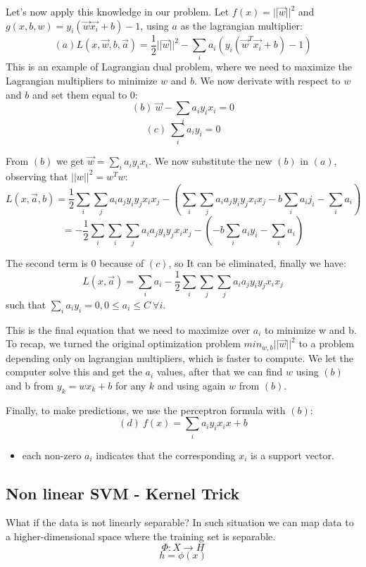 \documentclass{article}
\begin{document}
Let's now apply this knowledge in our problem. Let
\(f(x)=||\vec{w}||^2\) and \(g(x, b, w)=y_i(\vec{w}\vec{x_i}+b)-1\),
using \(a\) as the lagrangian multiplier:
\[(a) L(x, \vec{w}, b, \vec{a}) = \frac{1}{2}||\vec{w}||^2 - \sum_i a_i (y_i(\vec{w}^T\vec{x_i} + b) - 1)\]
This is an example of Lagrangian dual problem, where we need to maximize
the Lagrangian multipliers to minimize \(w\) and \(b\). We now derivate
with respect to \(w\) and \(b\) and set them equal to \(0\):
\[(b)\ \vec{w} - \sum_i a_i y_i x_i = 0\] \[(c)\ \sum_i a_i y_i = 0\]

From \((b)\) we get \(\vec{w} = \sum_i a_i y_i x_i\). We now substitute
the new \((b)\) in \((a)\), observing that \(||w||^2 = w^Tw\):
\[L(x, \vec{a}, b) = \frac{1}{2}\sum_i \sum_j a_i a_j y_i y_j x_i x_j - (\sum_i \sum_j a_i a_j y_i y_j x_i x_j - b\sum_i a_i j_i - \sum_i a_i) \]
\[ = -\frac{1}{2}\sum_i \sum_i \sum_j a_i a_j y_i y_j x_i x_j - (-b\sum_i a_i y_i - \sum_i a_i) \]

The second term is \(0\) because of \((c)\), so It can be eliminated,
finally we have:
\[ L(x, \vec{a}) = \sum_i a_i -\frac{1}{2}\sum_i \sum_j \sum_j a_i a_j y_i y_j x_i x_j \]
such that \(\sum_i a_i y_i = 0, 0 \le a_i \le C\ \forall i\).

This is the final equation that we need to maximize over \(a_i\) to
minimize w and b. To recap, we turned the original optimization problem
\(min_{w, b} ||\vec{w}||^2\) to a problem depending only on lagrangian
multipliers, which is faster to compute. We let the computer solve this
and get the \(a_i\) values, after that we can find \(w\) using \((b)\)
and b from \(y_k = wx_k + b\) for any \(k\) and using again \(w\) from
\((b)\).

Finally, to make predictions, we use the perceptron formula with
\((b)\): \[(d)\ f(x) = \sum_i a_iy_i x_i x + b\]

\begin{itemize}
\tightlist
\item
  each non-zero \(a_i\) indicates that the corresponding \(x_i\) is a
  support vector.
\end{itemize}

\subsection{Non linear SVM - Kernel
Trick}\label{non-linear-svm---kernel-trick}

What if the data is not linearly separable? In such situation we can map
data to a higher-dimensional space where the training set is separable.
\[\Phi: X \rightarrow H\] \[h=\phi(x)\]
\end{document}
